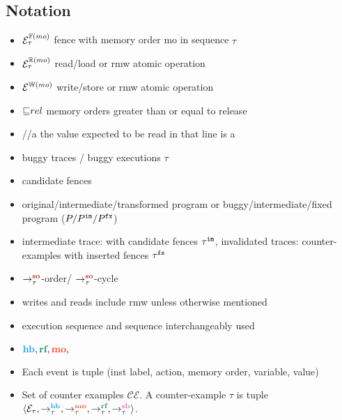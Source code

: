 \subsection{Notation}
\begin{itemize}
	\item $\ordfences{mo}_\tau$ \quad fence with memory order mo in sequence $\tau$
	\item $\ordreads{mo}_\tau$ \quad read/load or rmw atomic operation
	\item $\ordwrites{mo}$ \qquad write/store or rmw atomic operation
	\item $\mole rel$ \qquad memory orders greater than or equal to release
	\item \color{olive}//a \color{black} \qquad the value expected to be read in that line is a
	\item buggy traces / buggy executions  $\tau$
	\item candidate fences
	\item original/intermediate/transformed program or buggy/intermediate/fixed program ($ P/ \im{P}/ \fx{P} $)
	\item intermediate trace: with candidate fences $ \im{\tau} $, invalidated traces: counter-examples with inserted fences $\fx{\tau}$
	\item $\setSO$-order/ $\setSO$-cycle
	\item writes and reads include rmw unless otherwise mentioned
	\item execution sequence and sequence interchangeably used
	\item $ \lhb, \lrf, \lmo, $ 
	\item Each event is tuple (inst label, action, memory order, variable, value) 
	\item Set of counter examples $ \mathcal{CE} $. A counter-example $ \tau $ is tuple $ \langle \events_\tau, \setHB, \setMO, \setRF, \setSB  \rangle $. 
\end{itemize}